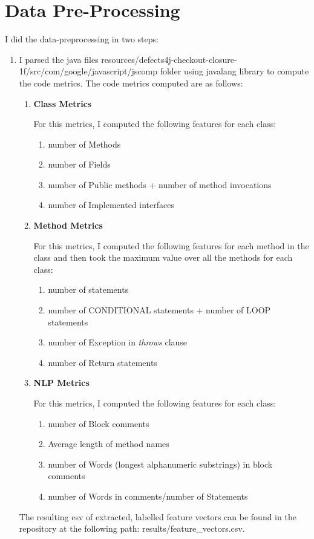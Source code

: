 \documentclass{article}
\begin{document}
\section{Data Pre-Processing}
I did the data-preprocessing in two steps:
\begin{enumerate}
    \item I parsed the java files resources/defects4j-checkout-closure-1f/src/com/google/javascript/jscomp folder using javalang library to compute the code metrics. 
    The code metrics computed are as follows:
    \begin{enumerate}
        \item \textbf{Class Metrics}
    
        For this metrics, I computed the following features for each class:
        \begin{enumerate}
            \item number of Methods
            \item number of Fields
            \item number of Public methods + number of method invocations
            \item number of Implemented interfaces
        \end{enumerate}
        \item \textbf{Method Metrics}
    
        For this metrics, I computed the following features for each method in the class 
        and then took the maximum value over all the methods for each class:
        \begin{enumerate}
            \item number of statements
            \item number of CONDITIONAL statements + number of LOOP statements
            \item number of Exception in \textit{throws} clause
            \item number of Return statements
        \end{enumerate}
        \item  \textbf{NLP Metrics}
        
        For this metrics, I computed the following features for each class:
        \begin{enumerate}
            \item number of Block comments
            \item Average length of method names
            \item number of Words (longest alphanumeric substrings)
            in block comments
            \item number of Words in comments/number of Statements
        \end{enumerate}
    \end{enumerate}
    The resulting csv of extracted, labelled feature vectors can be found in the repository at the following path: results\//feature\_vectors.csv.


\end{enumerate}
\end{document}
